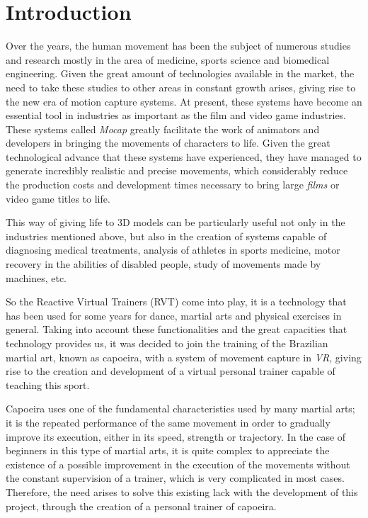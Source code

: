 %
%


\addtocounter{chapter}{-1} 
\chapter{Introduction}

\label{cap1:sec:introduction}

Over the years, the human movement has been the subject of numerous studies and research mostly in the area of medicine, sports science and biomedical engineering. Given the great amount of technologies available in the market, the need to take these studies to other areas in constant growth arises, giving rise to the new era of motion capture systems. At present, these systems have become an essential tool in industries as important as the film and video game industries. These systems called \textit{Mocap} greatly facilitate the work of animators and developers in bringing the movements of characters to life. Given the great technological advance that these systems have experienced, they have managed to generate incredibly realistic and precise movements, which considerably reduce the production costs and development times necessary to bring large \textit{films} or video game titles to life. 

This way of giving life to 3D models can be particularly useful not only in the industries mentioned above, but also in the creation of systems capable of diagnosing medical treatments, analysis of athletes in sports medicine, motor recovery in the abilities of disabled people, study of movements made by machines, etc.

So the Reactive Virtual Trainers (RVT) come into play, it is a technology that has been used for some years for dance, martial arts and physical exercises in general. Taking into account these functionalities and the great capacities that technology provides us, it was decided to join the training of the Brazilian martial art, known as capoeira, with a system of movement capture in \textit{VR}, giving rise to the creation and development of a virtual personal trainer capable of teaching this sport. 

Capoeira uses one of the fundamental characteristics used by many martial arts; it is the repeated performance of the same movement in order to gradually improve its execution, either in its speed, strength or trajectory. In the case of beginners in this type of martial arts, it is quite complex to appreciate the existence of a possible improvement in the execution of the movements without the constant supervision of a trainer, which is very complicated in most cases. Therefore, the need arises to solve this existing lack with the development of this project, through the creation of a personal trainer of capoeira.

